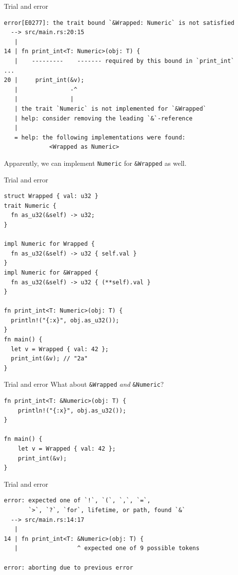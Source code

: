 \documentclass{beamer}
\begin{document}
\begin{frame}[fragile]{Trial and error}
  \begin{verbatim}
error[E0277]: the trait bound `&Wrapped: Numeric` is not satisfied
  --> src/main.rs:20:15
   |
14 | fn print_int<T: Numeric>(obj: T) {
   |    ---------    ------- required by this bound in `print_int`
...
20 |     print_int(&v);
   |               -^
   |               |
   | the trait `Numeric` is not implemented for `&Wrapped`
   | help: consider removing the leading `&`-reference
   |
   = help: the following implementations were found:
             <Wrapped as Numeric>
\end{verbatim}
  \pause Apparently, we can implement \texttt{Numeric} for \texttt{&Wrapped} as well.
\end{frame}

\begin{frame}[fragile]{Trial and error}
  \begin{verbatim}
struct Wrapped { val: u32 }
trait Numeric {
  fn as_u32(&self) -> u32;
}

impl Numeric for Wrapped {
  fn as_u32(&self) -> u32 { self.val }
}
impl Numeric for &Wrapped {
  fn as_u32(&self) -> u32 { (**self).val }
}

fn print_int<T: Numeric>(obj: T) {
  println!("{:x}", obj.as_u32());
}
fn main() {
  let v = Wrapped { val: 42 };
  print_int(&v); // "2a"
}
\end{verbatim}
\end{frame}

\begin{frame}[fragile]{Trial and error}
  What about \texttt{&Wrapped} \emph{and} \texttt{&Numeric}?
  \begin{verbatim}
fn print_int<T: &Numeric>(obj: T) {
    println!("{:x}", obj.as_u32());
}

fn main() {
    let v = Wrapped { val: 42 };
    print_int(&v);
}
\end{verbatim}
\end{frame}

\begin{frame}[fragile]{Trial and error}
  \begin{verbatim}
error: expected one of `!`, `(`, `,`, `=`,
       `>`, `?`, `for`, lifetime, or path, found `&`
  --> src/main.rs:14:17
   |
14 | fn print_int<T: &Numeric>(obj: T) {
   |                 ^ expected one of 9 possible tokens

error: aborting due to previous error
\end{verbatim}
\end{frame}
\end{document}
